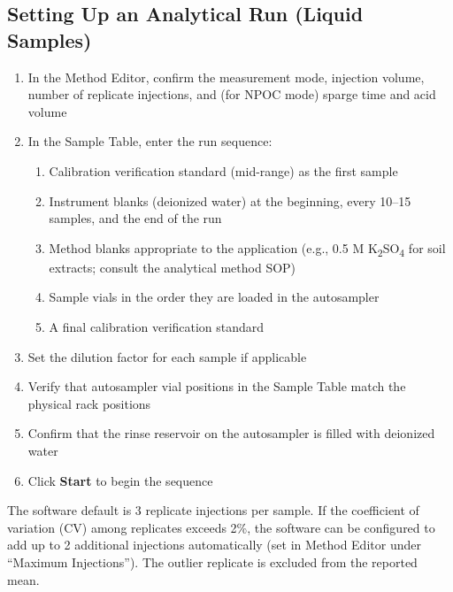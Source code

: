 \documentclass[
  11pt,
  letterpaper,
]{article}
\providecommand{\tightlist}{%
  \setlength{\itemsep}{0pt}\setlength{\parskip}{0pt}}
\begin{document}
\subsection{Setting Up an Analytical Run (Liquid
Samples)}\label{setting-up-an-analytical-run-liquid-samples}

\begin{enumerate}
\def\labelenumi{\arabic{enumi}.}
\tightlist
\item
  In the Method Editor, confirm the measurement mode, injection volume,
  number of replicate injections, and (for NPOC mode) sparge time and
  acid volume
\item
  In the Sample Table, enter the run sequence:

  \begin{enumerate}
  \def\labelenumii{\alph{enumii}.}
  \tightlist
  \item
    Calibration verification standard (mid-range) as the first sample
  \item
    Instrument blanks (deionized water) at the beginning, every 10--15
    samples, and the end of the run
  \item
    Method blanks appropriate to the application (e.g., 0.5 M
    K\textsubscript{2}SO\textsubscript{4} for soil extracts; consult the
    analytical method SOP)
  \item
    Sample vials in the order they are loaded in the autosampler
  \item
    A final calibration verification standard
  \end{enumerate}
\item
  Set the dilution factor for each sample if applicable
\item
  Verify that autosampler vial positions in the Sample Table match the
  physical rack positions
\item
  Confirm that the rinse reservoir on the autosampler is filled with
  deionized water
\item
  Click \textbf{Start} to begin the sequence
\end{enumerate}

\begin{tcolorbox}[enhanced jigsaw, arc=.35mm, bottomrule=.15mm, bottomtitle=1mm, breakable, colback=white, colbacktitle=quarto-callout-tip-color!10!white, colframe=quarto-callout-tip-color-frame, coltitle=black, left=2mm, leftrule=.75mm, opacityback=0, opacitybacktitle=0.6, rightrule=.15mm, title=\textcolor{quarto-callout-tip-color}{\faLightbulb}\hspace{0.5em}{Replicate Injection Settings}, titlerule=0mm, toprule=.15mm, toptitle=1mm]

The software default is 3 replicate injections per sample. If the
coefficient of variation (CV) among replicates exceeds 2\%, the software
can be configured to add up to 2 additional injections automatically
(set in Method Editor under ``Maximum Injections''). The outlier
replicate is excluded from the reported mean.

\end{tcolorbox}
\end{document}
